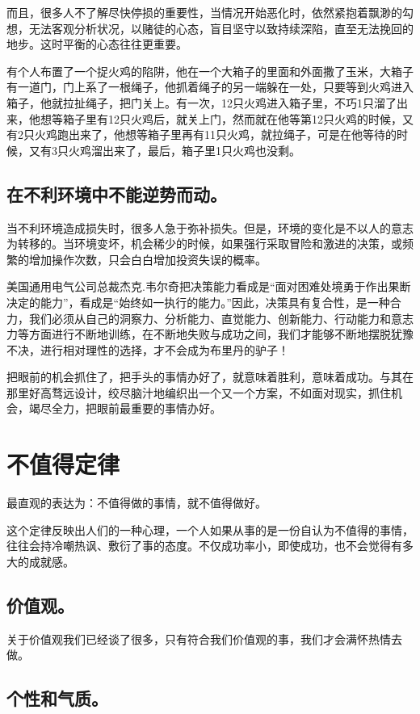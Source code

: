 \documentclass[11pt]{ctexart}
\begin{document}
而且，很多人不了解尽快停损的重要性，当情况开始恶化时，依然紧抱着飘渺的勾想，无法客观分析状况，以赌徒的心态，盲目坚守以致持续深陷，直至无法挽回的地步。这时平衡的心态往往更重要。

有个人布置了一个捉火鸡的陷阱，他在一个大箱子的里面和外面撒了玉米，大箱子有一道门，门上系了一根绳子，他抓着绳子的另一端躲在一处，只要等到火鸡进入箱子，他就拉扯绳子，把门关上。有一次，12只火鸡进入箱子里，不巧1只溜了出来，他想等箱子里有12只火鸡后，就关上门，然而就在他等第12只火鸡的时候，又有2只火鸡跑出来了，他想等箱子里再有11只火鸡，就拉绳子，可是在他等待的时候，又有3只火鸡溜出来了，最后，箱子里1只火鸡也没剩。
\subsection{在不利环境中不能逆势而动。}
\label{sec-16-5}


当不利环境造成损失时，很多人急于弥补损失。但是，环境的变化是不以人的意志为转移的。当环境变坏，机会稀少的时候，如果强行采取冒险和激进的决策，或频繁的增加操作次数，只会白白增加投资失误的概率。

美国通用电气公司总裁杰克.韦尔奇把决策能力看成是“面对困难处境勇于作出果断决定的能力”，看成是“始终如一执行的能力。”因此，决策具有复合性，是一种合力，我们必须从自己的洞察力、分析能力、直觉能力、创新能力、行动能力和意志力等方面进行不断地训练，在不断地失败与成功之间，我们才能够不断地摆脱犹豫不决，进行相对理性的选择，才不会成为布里丹的驴子！

把眼前的机会抓住了，把手头的事情办好了，就意味着胜利，意味着成功。与其在那里好高骛远设计，绞尽脑汁地编织出一个又一个方案，不如面对现实，抓住机会，竭尽全力，把眼前最重要的事情办好。
\section{不值得定律}
\label{sec-17}


最直观的表达为：不值得做的事情，就不值得做好。

这个定律反映出人们的一种心理，一个人如果从事的是一份自认为不值得的事情，往往会持冷嘲热讽、敷衍了事的态度。不仅成功率小，即使成功，也不会觉得有多大的成就感。
\subsection{价值观。}
\label{sec-17-1}


关于价值观我们已经谈了很多，只有符合我们价值观的事，我们才会满怀热情去做。
\subsection{个性和气质。}
\label{sec-17-2}
\end{document}

